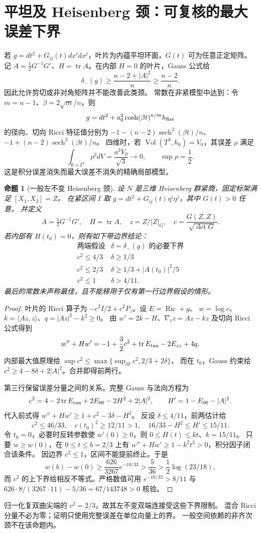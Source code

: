 \documentclass[UTF8,fontset=fandol,zihao=-4,oneside,openany]{ctexbook}
\theoremstyle{cjkplain}
\newtheorem{proposition}[theorem]{命题}
\numberwithin{equation}{chapter}
\DeclareMathOperator{\Ric}{Ric}
\DeclareMathOperator{\tr}{tr}
\begin{document}
\section{平坦及 Heisenberg 颈：可复核的最大误差下界}
\label{FND:homogeneousnecks}

若 \(g=dt^2+G_{ij}(t)dx^idx^j\)，叶片为内蕴平坦环面，\(G(t)\) 可为任意正定矩阵。
记 \(A=\tfrac12G^{-1}G'\)、\(H=\tr A\)。在内部 \(H=0\) 的叶片，Gauss 公式给
\[
\delta_-(g)\ge\frac{n-2+|A|^2}{n}\ge\frac{n-2}{n}.
\]
因此允许剪切或非对角矩阵并不能改善此类颈。
常数在非紧模型中达到：令 \(m=n-1\)、\(\beta=2\sqrt m/n\)，则
\[
g=dt^2+a_0^2\cosh(\beta t)^{n/m}h_{\rm flat}
\]
的径向、切向 Ricci 特征值分别为
\(-1-(n-2)\operatorname{sech}^2(\beta t)/n\)、
\(-1+(n-2)\operatorname{sech}^2(\beta t)/n\)。
四维时，若 \(\operatorname{Vol}(T^3,h_0)=V_0\)，其误差 \(\rho\) 满足
\[
\int_{\mathbb R\times T^3}\rho^2dV=\frac{a^3V_0}{\sqrt3}\to0,
\qquad\sup\rho=\frac12.
\]
这是积分误差消失而最大误差不消失的精确局部模型。

\begin{proposition}[一般左不变 Heisenberg 颈]
设 \(N\) 是三维 Heisenberg 群紧商，固定标架满足 \([X_1,X_2]=Z\)。
在紧区间 \(I\) 取 \(g=dt^2+G_{ij}(t)\eta^i\eta^j\)，其中 \(G(t)>0\) 任意，
并定义
\[
A=\tfrac12G^{-1}G',\quad H=\tr A,\quad z=Z/|Z|_G,
\quad c=\frac{G(Z,Z)}{\sqrt{\det G}}.
\]
若内部有 \(H(t_0)=0\)，则有如下带边界结论：
\[
\begin{array}{c|c}
\text{两端假设}&\delta=\delta_-(g)\text{ 的必要下界}\\ \hline
c^2\le4/3&\delta\ge1/3\\
c^2\le2/3&\delta\ge1/3+|A(t_0)|^2/5\\
c^2\le1&\delta>4/11.
\end{array}
\]
最后的常数未声称最佳，且不能移用于仅有第一行边界假设的情形。
\end{proposition}
\begin{proof}
叶片的 Ricci 算子为 \(-c^2I/2+c^2P_z\)。设 \(E=\Ric+g\)、
\(w=\log c\)、\(k=\langle Az,z\rangle\)、\(q=|Az|^2-k^2\ge0\)。
由 \(w'=2k-H\)、\(\nabla_tz=Az-kz\) 及切向 Ricci 公式得到
\[
w''+Hw'=-1+\frac32c^2+\tr E_{\rm tan}-2E_{zz}+4q.
\]
内部最大值原理给
\(\sup c^2\le\max\{\sup_{\partial I}c^2,2/3+2\delta\}\)，
而在 \(t_0\)，Gauss 约束给
\(c^2\ge4-8\delta+2|A|^2\)。合并即得前两行。

第三行保留误差分量之间的关系。完整 Gauss 与法向方程为
\[
c^2=4-2\tr E_{\rm tan}+2E_{00}-2H^2+2|A|^2,
\qquad H'=1-E_{00}-|A|^2.
\]
代入前式得 \(w''+Hw'\ge1+c^2-3\delta-H^2\)。
反设 \(\delta\le4/11\)，前两估计给
\[
c^2\le46/33,\quad c(t_0)^2\ge12/11>1,
\quad16/33-H^2\le H'\le15/11.
\]
令 \(t_0=0\)，必要时反转参数使 \(w'(0)\ge0\)，则
\(0\le H(t)\le kt\)、\(k=15/11\)。
只要 \(w\ge w(0)\)，在 \(0\le t\le b=2/3\) 上有
\(w''+Hw'\ge1-k^2t^2>0\)，积分因子闭合该条件。
因边界 \(c^2\le1\)，区间不能提前终止。于是
\[
w(b)-w(0)\ge\frac{626}{3267}e^{-10/33}
>\frac5{36}>\frac12\log(23/18),
\]
而 \(c^2\) 的上下界给相反不等式。严格数值可用
\(e^{-10/33}>8/11\) 与
\(626\cdot8/(3267\cdot11)-5/36=67/143748>0\) 核验。
\end{proof}
归一化复双曲尖端的 \(c^2=2/3\)，故其左不变双端连接受这些下界限制。
混合 Ricci 分量不必为零；证明只使用完整误差在单位向量上的界。
一般空间依赖的非齐次颈不在该命题内。
\end{document}
